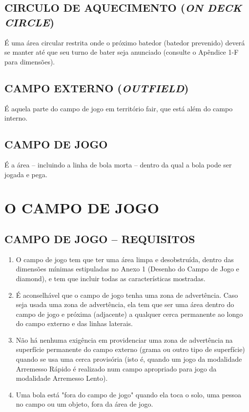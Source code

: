 \subsection{CIRCULO DE AQUECIMENTO (\textit{ON DECK CIRCLE})}
 É uma área circular restrita onde o próximo batedor (batedor prevenido) deverá se manter até que seu turno de bater seja anunciado (consulte o Apêndice 1-F para dimensões).

\subsection{CAMPO EXTERNO (\textit{OUTFIELD})}
 É aquela parte do campo de jogo em território \gls{fair}, que está além do campo interno.

\subsection{CAMPO DE JOGO}
É a área -- incluindo a linha de bola morta -- dentro da qual a bola pode ser jogada  e pega.
\section{O CAMPO DE JOGO}

\subsection{CAMPO DE JOGO -- REQUISITOS}

	\begin{enumerate}[label=(\alph*)]
		\item O campo de jogo tem que ter uma área limpa e desobstruída, dentro das dimensões mínimas estipuladas no Anexo 1 (Desenho do Campo de Jogo e \gls{diamond}), e tem que incluir todas as características mostradas.

	 	\item É aconselhável que o campo de jogo tenha uma zona de advertência. Caso seja usada uma zona de advertência, ela tem que ser uma área dentro do campo de jogo e próxima (adjacente) a qualquer cerca permanente ao longo do campo externo e das linhas laterais.

	 	\item Não há nenhuma exigência em providenciar uma zona de advertência na  superfície permanente do campo externo (grama ou outro tipo de superfície) quando se usa uma cerca provisória (isto é, quando um jogo da modalidade Arremesso Rápido é realizado num campo apropriado para jogo da modalidade Arremesso Lento).

		\item Uma bola está "fora do campo de jogo" quando ela toca o solo, uma pessoa  no campo ou um objeto, fora da área de jogo.
	\end{enumerate}

